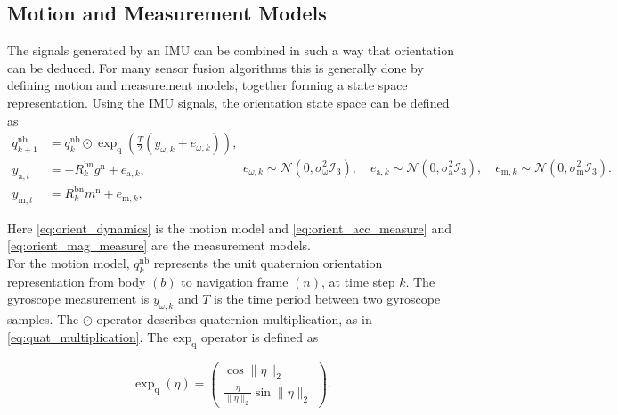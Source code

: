 \subsection{Motion and Measurement Models}
\label{sec:motion_and_measurement_models}
The signals generated by an \ac{IMU} can be combined in such a way that orientation can be deduced. For many sensor fusion algorithms this is generally done by defining motion and measurement models, together forming a state space representation. Using the \ac{IMU} signals, the orientation state space can be defined \cite{Kok2017} as 
\begin{subequations}
	\begin{align}
		\label{eq:orient_dynamics}
		q_{k+1}^{\mathrm{nb}} &=q_{k}^{\mathrm{nb}} \odot \exp _{\mathrm{q}}\left(\frac{T}{2}\left(y_{\omega, k}+e_{\omega, k}\right)\right), 	\\ 
		\label{eq:orient_acc_measure}
		y_{\mathrm{a}, t} &=-R_{k}^{\mathrm{bn}} g^{\mathrm{n}}+e_{\mathrm{a}, k},\\ 
		\label{eq:orient_mag_measure}
		y_{\mathrm{m}, t} &=R_{k}^{\mathrm{bn}} m^{\mathrm{n}}+e_{\mathrm{m}, k}, 
	\end{align}
	\begin{equation}
		\label{eq:orient_ss_noise}
		e_{\omega, k} \sim \mathcal{N}\left(0, \sigma_{\mathrm{\omega}}^{2} \mathcal{I}_{3}\right), 
		\quad 
		e_{\mathrm{a}, k} \sim \mathcal{N}\left(0, \sigma_{\mathrm{a}}^{2} \mathcal{I}_{3}\right), 
		\quad 
		e_{\mathrm{m}, k} \sim \mathcal{N}\left(0, \sigma_{\mathrm{m}}^{2} \mathcal{I}_{3}\right).
	\end{equation}
	\label{eq:orient_state_space}
\end{subequations}

Here \eqref{eq:orient_dynamics} is the motion model and \eqref{eq:orient_acc_measure} and \eqref{eq:orient_mag_measure} are the measurement models. \\
For the motion model, $q^{\mathrm{nb}}_k$ represents the unit quaternion orientation representation from body $(b)$ to navigation frame $(n)$, at time step $ k $.  The gyroscope measurement is $y_{\omega, k}$ and $T$ is the time period between two gyroscope samples. The $\odot$ operator describes quaternion multiplication, as in \eqref{eq:quat_multiplication}. The $\text{exp}_\text{q}$ operator is defined as

\begin{equation}
	\exp_\mathrm{q} (\eta) = \left(\begin{array}{c}{\cos \|\eta\|_{2}} \\ {\frac{\eta}{\|\eta\|_{2}} \sin \|\eta\|_{2}}\end{array}\right) \label{eq:exp_q_in_text}.
\end{equation}

